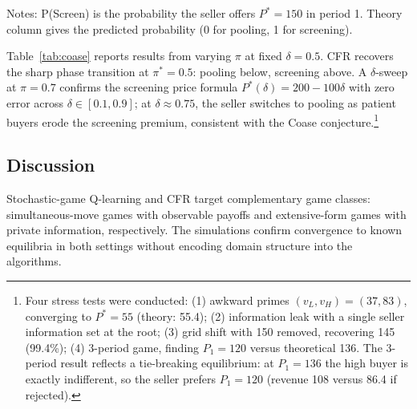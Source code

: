 \begin{table}[htbp]
\centering
\caption{CFR Equilibrium vs. Theory: $\pi$-sweep at $\delta = 0.5$}
\label{tab:coase}

\begin{minipage}{0.9\textwidth}
\footnotesize
Notes: P(Screen) is the probability the seller offers $P^* = 150$ in period 1. Theory column gives the predicted probability (0 for pooling, 1 for screening).
\end{minipage}
\end{table}

Table~\ref{tab:coase} reports results from varying $\pi$ at fixed $\delta = 0.5$. CFR recovers the sharp phase transition at $\pi^* = 0.5$: pooling below, screening above. A $\delta$-sweep at $\pi = 0.7$ confirms the screening price formula $P^*(\delta) = 200 - 100\delta$ with zero error across $\delta \in [0.1, 0.9]$; at $\delta \approx 0.75$, the seller switches to pooling as patient buyers erode the screening premium, consistent with the Coase conjecture.\footnote{Four stress tests were conducted: (1) awkward primes $(v_L, v_H) = (37, 83)$, converging to $P^* = 55$ (theory: 55.4); (2) information leak with a single seller information set at the root; (3) grid shift with 150 removed, recovering 145 (99.4\%); (4) 3-period game, finding $P_1 = 120$ versus theoretical 136. The 3-period result reflects a tie-breaking equilibrium: at $P_1 = 136$ the high buyer is exactly indifferent, so the seller prefers $P_1 = 120$ (revenue 108 versus 86.4 if rejected).}

\subsection{Discussion}

Stochastic-game Q-learning and CFR target complementary game classes: simultaneous-move games with observable payoffs and extensive-form games with private information, respectively. The simulations confirm convergence to known equilibria in both settings without encoding domain structure into the algorithms.
